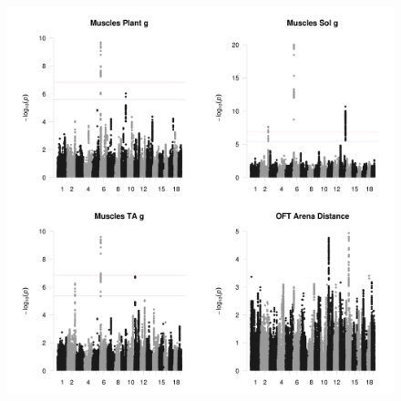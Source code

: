 \documentclass{article}
\begin{document}
\begin{figure}
\begin{center}
\includegraphics[width=15cm, height=15cm]{37.jpeg}
\end{center}
\end{figure}
\end{document}
